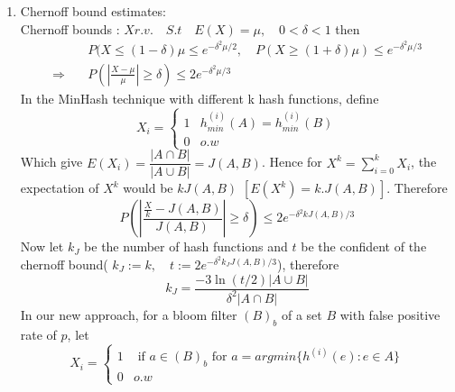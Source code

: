 \documentclass[11pt]{amsart}
\theoremstyle{remark}
\numberwithin{equation}{section}
\begin{document}
\begin{enumerate}
\item Chernoff bound estimates:\\

Chernoff bounds :
 $X r.v.\quad S.t\quad E(X)=\mu,\quad 0<\delta<1$ then
\begin{align*}
&P(X\leq(1-\delta)\mu\leq e^{-\delta^2\mu/2},\quad P(X\geq(1+\delta)\mu)\leq e^{-\delta^2\mu/3} \\
\Rightarrow\quad &P(\left|\frac{X-\mu}{\mu}\right|\geq\delta)\leq2e^{-\delta^2\mu/3}
\end{align*}
In the MinHash technique with different k hash functions, define
$$X_i=\left\{
\begin{array}{lll}
1 &h^{(i)}_{min}(A)=h^{(i)}_{min}(B)\\
0& o.w
\end{array}
\right.$$
Which give 
$E(X_i)= \dfrac{|A\cap B|}{|A\cup B|}=J(A,B)$.
Hence for 
$X^k=\sum\limits_{i=0}^k X_i$,
the expectation of $X^k$ would be $kJ(A,B)$
$[E(X^k)=k.J(A,B)]$. Therefore
$$P\left( \left|\dfrac{\frac{X}{k}-J(A,B)}{J(A,B)}\right|\geq\delta\right)\leq 2e^{-\delta^2kJ(A,B)/3}$$
Now let $k_J$ be the number of hash functions and $t$ be the confident of the chernoff bound( $k_J:=k,\quad t:=2e^{-\delta^2k_JJ(A,B)/3}$), therefore
$$k_J=\dfrac{-3\ln(t/2)|A\cup B|}{\delta^2 |A\cap B|}$$
In our new approach, for a bloom filter $(B)_b$ of a set $B$ with false positive rate of $p$, let 
$$X_i=\left\{
\begin{array}{ll}
1&\text{ if } a\in(B)_b\text{ for } a=argmin\{h^{(i)}{(e)}:e\in A\}\\
0& o.w
\end{array}
\right.$$


\end{enumerate}
\end{document}
